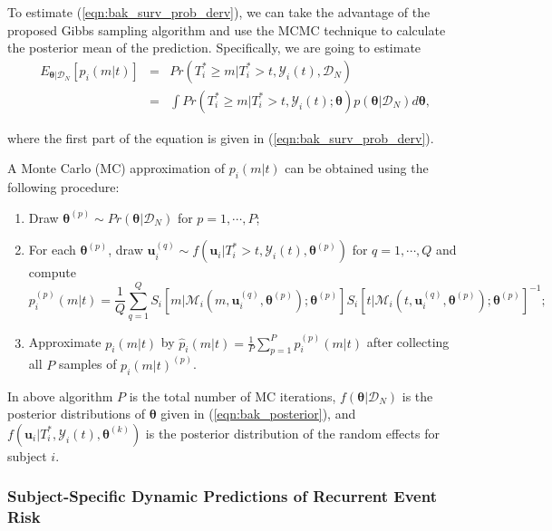 To estimate (\ref{eqn:bak_surv_prob_derv}), we can take the advantage of the proposed Gibbs sampling algorithm and use the MCMC technique to calculate the posterior mean of the prediction. Specifically, we are going to estimate
\begin{eqnarray}\label{eqn:bak_expct_pred}
\nonumber E_{\boldsymbol{\theta}|\mathcal{D}_N}[p_i(m|t)]&=&Pr(T_i^*\ge m|T_i^*>t, \mathcal{Y}_{i}(t), \mathcal{D}_N)\\
\nonumber &=&\int Pr(T_i^*\ge m|T_i^*>t, \mathcal{Y}_{i}(t);\boldsymbol{\theta})p(\boldsymbol{\theta}|\mathcal{D}_N)d\boldsymbol{\theta},
\end{eqnarray}

\noindent where the first part of the equation is given in (\ref{eqn:bak_surv_prob_derv}).\par

A Monte Carlo (MC) approximation of $p_i(m|t)$ can be obtained using the following procedure:

\begin{enumerate}
\item Draw $\boldsymbol{\theta}^{(p)} \sim Pr(\boldsymbol{\theta}|\mathcal{D}_N)$ for $p=1, \cdots, P$;
\item For each $\boldsymbol{\theta}^{(p)}$, draw ${\boldsymbol u}^{(q)}_i\sim f({\boldsymbol u}_i|T_i^*>t, \mathcal{Y}_{i}(t), \boldsymbol{\theta}^{(p)})$ for $q=1, \cdots, Q$ and compute $$p_i^{(p)}(m|t)=\frac{1}{Q}\sum_{q=1}^QS_i[m|\mathcal{M}_{i}(m, \boldsymbol{u}^{(q)}_i, \boldsymbol{\theta}^{(p)});\boldsymbol{\theta}^{(p)}]S_i[t|\mathcal{M}_{i}(t, \boldsymbol{u}^{(q)}_i, \boldsymbol{\theta}^{(p)});\boldsymbol{\theta}^{(p)}]^{-1};$$
\item Approximate $p_i(m|t)$ by $\hat{p}_i(m|t)=\frac{1}{P}\sum_{p=1}^P p^{(p)}_i(m|t)$ after collecting all $P$ samples of $p_i(m|t)^{(p)}$.
\end{enumerate}

In above algorithm $P$ is the total number of MC iterations, $f(\boldsymbol{\theta}|\mathcal{D}_N)$ is the posterior distributions of
$\boldsymbol{\theta}$ given in (\ref{eqn:bak_posterior}), and $f({\boldsymbol u}_i|T_i^*, \mathcal{Y}_{i}(t), \boldsymbol{\theta}^{(k)})$ is the posterior distribution of the random effects for subject $i$.



\subsubsection{Subject-Specific Dynamic Predictions of Recurrent Event Risk}\label{sec:bak_pred_jm_recurrent}

